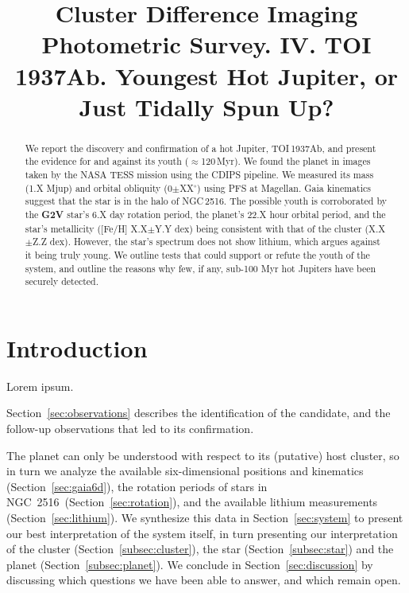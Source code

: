 \documentclass[12pt,twocolumn,tighten]{aastex63}
\newcommand{\cn}{NGC~2516} %
\begin{document}

\title{
  Cluster Difference Imaging Photometric Survey. IV.
  TOI 1937Ab. Youngest Hot Jupiter, or Just Tidally Spun Up?
}



\begin{abstract}
  We report the discovery and confirmation of a hot Jupiter,
  TOI\,1937Ab, and present the evidence for and against its youth
  ($\approx$120\,Myr).
  We found the planet in images taken by the NASA TESS mission
  using the CDIPS pipeline.
  We measured its mass (1.X Mjup) and orbital obliquity
  (0$\pm$XX$^\circ$) using PFS at Magellan.
  Gaia kinematics suggest that the star is in the halo of NGC\,2516.
  The possible youth is corroborated by the {\bf G2V} star's 6.X day
  rotation period, the planet's 22.X hour orbital period, and the
  star's metallicity ([Fe/H] X.X$\pm$Y.Y dex) being consistent with
  that of the cluster (X.X$\pm$Z.Z dex).
  However, the star's spectrum does not show lithium, which argues
  against it being truly young.
  We outline tests that could support or refute the youth of the
  system, and outline the reasons why few, if any, sub-100 Myr hot
  Jupiters have been securely detected.
\end{abstract}




\section{Introduction}

Lorem ipsum.

Section~\ref{sec:observations} describes the identification of the
candidate, and the follow-up observations that led to its confirmation.

The planet can only be understood with respect to its (putative)
host cluster, so in turn we analyze the
available six-dimensional positions and kinematics (Section~\ref{sec:gaia6d}),
the rotation periods of stars in \cn\ 
(Section~\ref{sec:rotation}), and the available lithium measurements
(Section~\ref{sec:lithium}).
We synthesize this data in
Section~\ref{sec:system} to present our best interpretation of the
system itself, in turn presenting our interpretation of the
cluster
(Section~\ref{subsec:cluster}), the star (Section~\ref{subsec:star})
and the planet (Section~\ref{subsec:planet}).  We conclude in
Section~\ref{sec:discussion} by discussing which questions we have
been able to answer, and which remain open.
\end{document}
